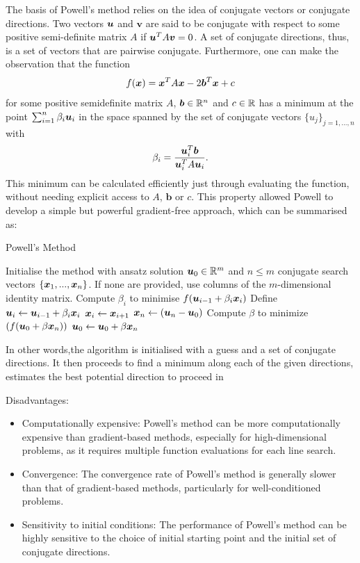 The basis of Powell's method relies on the idea of conjugate vectors or conjugate directions. Two vectors $\boldsymbol{u}$ and $\boldsymbol{v}$ are said to be conjugate with respect to some positive semi-definite matrix $A$ if $\boldsymbol{u}^T A \boldsymbol{v} = 0$. A set of conjugate directions, thus, is a set of vectors that are pairwise conjugate. Furthermore, one can make the observation \cite{brent_algorithms_2002} that the function
\begin{equation}
    f(\boldsymbol{x}) = \boldsymbol{x}^T A \boldsymbol{x} - 2\boldsymbol{b}^T \boldsymbol{x} + c
\end{equation}
for some positive semidefinite matrix $A$, $\boldsymbol{b} \in \mathbb{R}^n$ and $c \in \mathbb{R}$ has a minimum at the point $\sum_{i=1}^n \beta_i \boldsymbol{u}_i$ in the space spanned by the set of conjugate vectors $\{ u_j \}_{j = 1,...,n}$ with
\begin{equation}
    \beta_i = \frac{\boldsymbol{u}_i^T\boldsymbol{b}}{\boldsymbol{u}_i^T A \boldsymbol{u}_i}.
\end{equation}
This minimum can be calculated efficiently just through evaluating the function, without needing explicit access to $A$, $\boldsymbol{b}$ or $c$. This property allowed Powell to develop a simple but powerful gradient-free approach, which can be summarised as:
\begin{algorithm}
\caption{Powell's Method}
\begin{algorithmic}[1]
\State Initialise the method with ansatz solution $\boldsymbol{u}_0 \in \mathbb{R}^m$ and $n \leq m$ conjugate search vectors $\{\boldsymbol{x}_1, ..., \boldsymbol{x}_n \}$. If none are provided, use columns of the $m$-dimensional identity matrix.
\State Compute $\beta_i$ to minimise $f(\boldsymbol{u}_{i - 1} + \beta_i \boldsymbol{x}_i)$
\State Define $\boldsymbol{u}_i \gets \boldsymbol{u}_{i - 1} + \beta_i \boldsymbol{x}_i$
\EndFor
{}
\State $\boldsymbol{x}_{i} \gets \boldsymbol{x}_{i+1}$
\EndFor
\State $\boldsymbol{x}_n \gets (\boldsymbol{u}_n - \boldsymbol{u}_0)$
\State Compute $\beta$ to minimize $(f(\boldsymbol{u}_0  + \beta \boldsymbol{x}_n))$
\State $\boldsymbol{u}_0 \gets \boldsymbol{u}_0 + \beta \boldsymbol{x}_n$
\EndProcedure
\end{algorithmic}
\end{algorithm}
In other words,the algorithm is initialised with a guess and a set of conjugate directions. It then proceeds to find a minimum along each of the given directions, estimates the best potential direction to proceed in 

Disadvantages:

\begin{itemize}
    \item Computationally expensive: Powell's method can be more computationally expensive than gradient-based methods, especially for high-dimensional problems, as it requires multiple function evaluations for each line search.
    \item Convergence: The convergence rate of Powell's method is generally slower than that of gradient-based methods, particularly for well-conditioned problems.
    \item Sensitivity to initial conditions: The performance of Powell's method can be highly sensitive to the choice of initial starting point and the initial set of conjugate directions.
\end{itemize}

